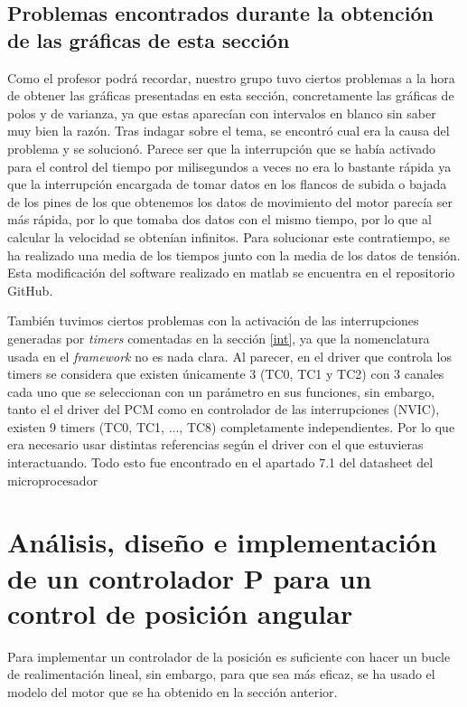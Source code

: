 \documentclass[a4paper]{article}
\begin{document}
\subsection{Problemas encontrados durante la obtención de las gráficas de esta sección}
Como el profesor podrá recordar, nuestro grupo tuvo ciertos problemas a la hora de obtener las gráficas presentadas en esta sección, concretamente las gráficas de polos y de varianza,
ya que estas aparecían con intervalos en blanco sin saber muy bien la razón. Tras indagar sobre el tema, se encontró cual era la causa
del problema y se solucionó. Parece ser que la interrupción que se había activado para el control del tiempo por milisegundos a veces
no era lo bastante rápida ya que la interrupción encargada de tomar datos en los flancos de subida o bajada de los pines de los que obtenemos
los datos de movimiento del motor parecía ser más rápida, por lo que tomaba dos datos con el mismo tiempo, por lo que al calcular la velocidad se obtenían infinitos.
Para solucionar este contratiempo, se ha realizado una media de los tiempos junto con la media de los datos de tensión.
Esta modificación del software realizado en matlab se encuentra en el repositorio GitHub.

También tuvimos ciertos problemas con la activación de las interrupciones generadas por \emph{timers} comentadas en la sección \ref{int}, ya que la nomenclatura usada en el \emph{framework} no es nada clara.
Al parecer, en el driver que controla los timers se considera que existen únicamente 3 (TC0, TC1 y TC2) con 3 canales cada uno que se seleccionan con un parámetro en sus funciones,
sin embargo, tanto el el driver del PCM como en controlador de las interrupciones (NVIC), existen 9 timers (TC0, TC1, ..., TC8) completamente independientes. Por lo que era necesario
usar distintas referencias según el driver con el que estuvieras interactuando. Todo esto fue encontrado en el apartado 7.1 del datasheet del microprocesador \cite{SAM3X/A}

\section{Análisis, diseño e implementación de un controlador P para un control de posición angular \label{sec:control}}

Para implementar un controlador de la posición es suficiente con hacer un bucle de realimentación lineal,
sin embargo, para que sea más eficaz, se ha usado el modelo del motor que se ha obtenido en la sección anterior.
\end{document}
